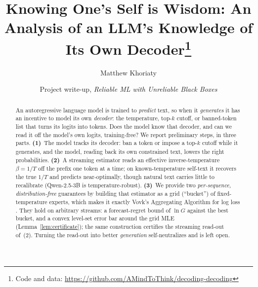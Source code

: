 \documentclass[11pt]{article}
\title{Knowing One's Self is Wisdom: An Analysis of an LLM's Knowledge of Its Own Decoder\thanks{Code and data: \url{https://github.com/AMindToThink/decoding-decoding}}}
\author{Matthew Khoriaty}
\date{Project write-up, \emph{Reliable ML with Unreliable Black Boxes}}
\begin{document}
\maketitle

\begin{abstract}
An autoregressive language model is trained to \emph{predict} text, so when it
\emph{generates} it has an incentive to model its own \emph{decoder}: the
temperature, top-$k$ cutoff, or banned-token list that turns its logits into
tokens. Does the model know that decoder, and can we read it off the model's own
logits, training-free? We report preliminary steps, in three parts.
\textbf{(1)}~The model tracks its decoder: ban a token or impose a top-$k$ cutoff
while it generates, and the model, reading back its own constrained text, lowers
the right probabilities. \textbf{(2)}~A streaming estimator reads an effective
inverse-temperature $\beta = 1/T$ off the prefix one token at a time; on
known-temperature self-text it recovers the true $1/T$ and predicts
near-optimally, though natural text carries little to recalibrate (Qwen-2.5-3B is
temperature-robust). \textbf{(3)}~We provide two \emph{per-sequence,
distribution-free} guarantees by building that estimator as a grid (``bucket'') of
fixed-temperature experts, which makes it exactly Vovk's Aggregating Algorithm for
log loss \citep{vovk1998game}. They hold on arbitrary streams: a forecast-regret
bound of $\ln G$ against the best bucket, and a convex level-set error bar around
the grid MLE (Lemma~\ref{lem:certificate}); the same construction certifies the
streaming read-out of~(2). Turning the read-out into better \emph{generation}
self-neutralizes and is left open.
\end{abstract}

\end{document}
